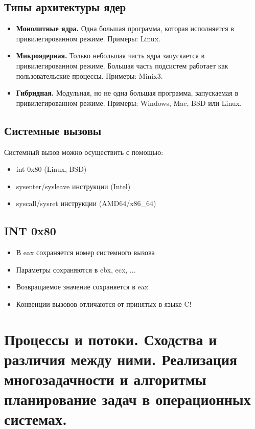 \begin{multicols}{2}
      \subsection*{Типы архитектуры ядер}
      
      \begin{itemize}
        \item \textbf{Монолитные ядра.} Одна большая программа, которая исполняется 
        в привилегированном режиме. Примеры: Linux.
        \item \textbf{Микроядерная.} Только небольшая часть ядра запускается в привилегированном
        режиме. Большая часть подсистем работает как пользовательские процессы. Примеры: Minix3.
        \item \textbf{Гибридная.} Модульная, но не одна большая программа, запускаемая в
        привилегированном режиме. Примеры: Windows, Mac, BSD или Linux.
      \end{itemize}
      
      \subsection*{Системные вызовы}
      
      Системный вызов можно осуществить с помощью:
      \begin{itemize}
        \item int 0x80 (Linux, BSD)
        \item sysenter/sysleave инструкции (Intel)
        \item syscall/sysret инструкции (AMD64/x86\_64)
      \end{itemize}
      
      \subsection*{INT 0x80}
      
      \begin{itemize}
        \item В eax сохраняется номер системного вызова
        \item Параметры сохраняются в ebx, ecx, ...
        \item Возвращаемое значение сохраняется в eax
        \item Конвенции вызовов отличаются от принятых в языке C!
      \end{itemize}
      
    \section{Процессы и потоки. Сходства и различия между ними. Реализация многозадачности и
    алгоритмы планирование задач в операционных системах.}

\end{multicols}
